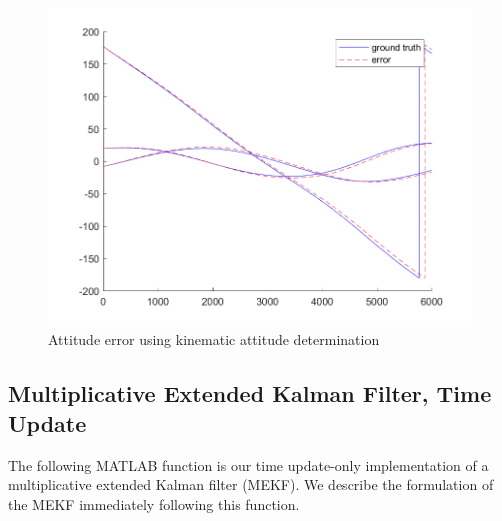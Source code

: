 \begin{figure}[H]
\centering
\includegraphics[scale=0.6]{Images/ps7_problem4_kin.png}
\caption{Attitude error using kinematic attitude determination}
\label{fig:ps7_problem4_kin}
\end{figure}

\subsection{Multiplicative Extended Kalman Filter, Time Update}
The following MATLAB function is our time update-only implementation of a multiplicative extended Kalman filter (MEKF). We describe the formulation of the MEKF immediately following this function.



